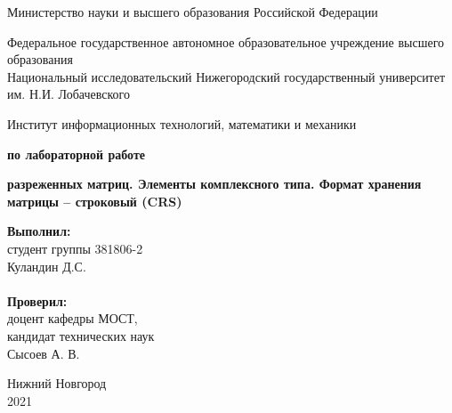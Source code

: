 \documentclass{report}
\begin{document}
\begin{titlepage}

\begin{center}
Министерство науки и высшего образования Российской Федерации
\end{center}

\begin{center}
Федеральное государственное автономное образовательное учреждение высшего образования \\
Национальный исследовательский Нижегородский государственный университет им. Н.И. Лобачевского
\end{center}

\begin{center}
Институт информационных технологий, математики и механики
\end{center}

\vspace{4em}

\begin{center}
\textbf{ по лабораторной работе} \\
\end{center}
\begin{center}
\textbf{ разреженных матриц. Элементы комплексного типа. Формат хранения матрицы – строковый (CRS)} \\
\end{center}

\vspace{4em}

\newbox{\lbox}
\newlength{\maxl}
\setlength{\maxl}{\wd\lbox}
\hfill\parbox{7cm}{
\hspace*{5cm}\hspace*{-5cm}\textbf{Выполнил:} \\ студент группы 381806-2 \\ Куландин Д.С.\\
\\
\hspace*{5cm}\hspace*{-5cm}\textbf{Проверил:}\\ доцент кафедры МОСТ, \\ кандидат технических наук \\ Сысоев А. В.
}

\vspace{\fill}

\begin{center} Нижний Новгород \\ 2021 \end{center}

\end{titlepage}
\end{document}
